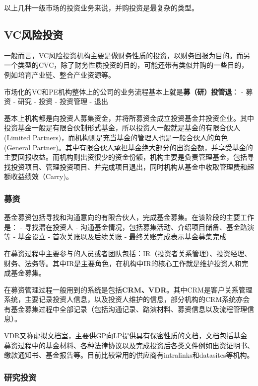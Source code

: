 \documentclass[
]{article}
\begin{document}
以上几种一级市场的投资业务来说，并购投资是最复杂的类型。

\hypertarget{vcux98ceux9669ux6295ux8d44}{%
\subsection{VC风险投资}\label{vcux98ceux9669ux6295ux8d44}}

一般而言，VC风险投资机构主要是做财务性质的投资，以财务回报为目的。而另一个类型的CVC，除了财务性质投资的目的，可能还带有类似并购的一些目的，例如培育产业链、整合产业资源等。

市场化的VC和PE机构整体上的公司的业务流程基本上就是\textbf{募（研）投管退}：
- 募资 - 研究 - 投资 - 投资管理 - 退出

基本上机构都是向投资人募集资金，并将所募资金成立投资基金并投资企业。其中投资基金一般是有限合伙制形式基金，所以投资人一般就是基金的有限合伙人(Limited
Partners)，而机构则是充当基金的管理人也是一般合伙人的角色(General
Partner)。其中有限合伙人承担基金绝大部分的出资金额，并享受基金的主要回报收益。而机构则出资很少的资金份额，机构主要是负责管理基金，包括寻找投资项目、管理投资项目、并完成项目退出，同时机构从基金中收取管理费和超额收益绩效（Carry)。

\hypertarget{ux52dfux8d44}{%
\subsubsection{募资}\label{ux52dfux8d44}}

基金募资包括寻找和沟通意向的有限合伙人，完成基金募集。在该阶段的主要工作是：
- 寻找潜在投资人 - 沟通基金情况，包括募集活动、介绍项目储备、基金路演等
- 基金设立 - 首次关账以及后续关账 - 最终关账完成表示基金募集完成

在募资过程中主要参与的人员或者团队包括：IR（投资者关系管理）、投资经理、财务、法务等。其中IR是主要角色，在机构中IR的核心工作就是维护投资人和完成基金募集。

在募资管理过程一般用到的系统是包括\textbf{CRM、VDR}。其中CRM是客户关系管理系统，主要记录投资人信息，以及投资人维护的信息，部分机构的CRM系统亦会有基金募集过程中全部记录（包括沟通记录、路演材料、募资信息以及流程管理信息）。

VDR又称虚拟文档室，主要供GP向LP提供具有保密性质的文档，文档包括基金募资过程中的基金材料、各种法律协议以及完成投资后各类文件例如出资证明书、缴款通知书、基金报告等。目前比较常用的供应商有intralinks和datasites等机构。

\hypertarget{ux7814ux7a76ux6295ux8d44}{%
\subsubsection{研究投资}\label{ux7814ux7a76ux6295ux8d44}}
\end{document}
